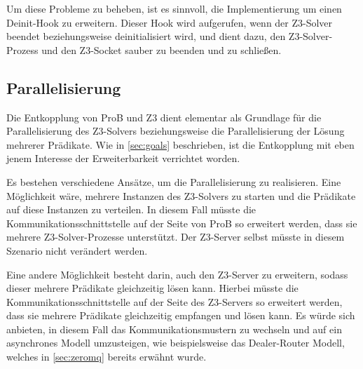 Um diese Probleme zu beheben, ist es sinnvoll, die Implementierung um einen Deinit-Hook zu erweitern.
Dieser Hook wird aufgerufen, wenn der Z3-Solver beendet beziehungsweise deinitialisiert wird, und dient dazu, den Z3-Solver-Prozess und den Z3-Socket sauber zu beenden und zu schließen.

\subsection{Parallelisierung}

Die Entkopplung von ProB und Z3 dient elementar als Grundlage für die Parallelisierung des Z3-Solvers
beziehungsweise die Parallelisierung der Lösung mehrerer Prädikate.
Wie in \cref{sec:goals} beschrieben, ist die Entkopplung mit eben jenem Interesse der Erweiterbarkeit verrichtet worden.

Es bestehen verschiedene Ansätze, um die Parallelisierung zu realisieren.
Eine Möglichkeit wäre, mehrere Instanzen des Z3-Solvers zu starten und die Prädikate auf diese Instanzen zu verteilen.
In diesem Fall müsste die Kommunikationsschnittstelle auf der Seite von ProB so erweitert werden, dass sie mehrere Z3-Solver-Prozesse unterstützt.
Der Z3-Server selbst müsste in diesem Szenario nicht verändert werden.

Eine andere Möglichkeit besteht darin, auch den Z3-Server zu erweitern, sodass dieser mehrere Prädikate gleichzeitig lösen kann.
Hierbei müsste die Kommunikationsschnittstelle auf der Seite des Z3-Servers so erweitert werden, dass sie mehrere Prädikate gleichzeitig empfangen und lösen kann.
Es würde sich anbieten, in diesem Fall das Kommunikationsmustern zu wechseln und auf ein asynchrones Modell umzusteigen, wie beispielsweise das Dealer-Router Modell,
welches in \cref{sec:zeromq} bereits erwähnt wurde.
